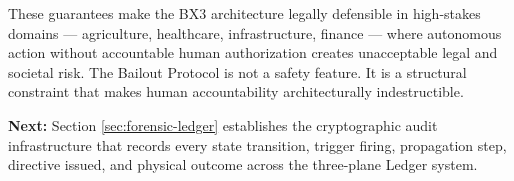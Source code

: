 These guarantees make the BX3 architecture legally defensible in high-stakes domains — agriculture, healthcare, infrastructure, finance — where autonomous action without accountable human authorization creates unacceptable legal and societal risk. The Bailout Protocol is not a safety feature. It is a structural constraint that makes human accountability architecturally indestructible.

\medskip
\noindent\textbf{Next:} Section \ref{sec:forensic-ledger} establishes the cryptographic audit infrastructure that records every state transition, trigger firing, propagation step, directive issued, and physical outcome across the three-plane Ledger system.


